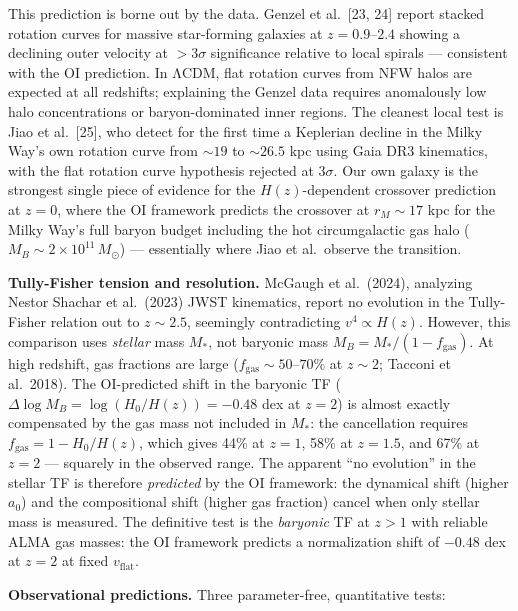 \documentclass[
]{article}
\begin{document}
This prediction is borne out by the data. Genzel et al.~{[}23, 24{]}
report stacked rotation curves for massive star-forming galaxies at
\(z = 0.9\text{–}2.4\) showing a declining outer velocity at
\(> 3\sigma\) significance relative to local spirals --- consistent with
the OI prediction. In ΛCDM, flat rotation curves from NFW halos are
expected at all redshifts; explaining the Genzel data requires
anomalously low halo concentrations or baryon-dominated inner regions.
The cleanest local test is Jiao et al.~{[}25{]}, who detect for the
first time a Keplerian decline in the Milky Way's own rotation curve
from \(\sim 19\) to \(\sim 26.5\) kpc using Gaia DR3 kinematics, with
the flat rotation curve hypothesis rejected at \(3\sigma\). Our own
galaxy is the strongest single piece of evidence for the
\(H(z)\)-dependent crossover prediction at \(z = 0\), where the OI
framework predicts the crossover at \(r_M \sim 17\) kpc for the Milky
Way's full baryon budget including the hot circumgalactic gas halo
(\(M_B \sim 2 \times 10^{11}\,M_\odot\)) --- essentially where Jiao et
al.~observe the transition.

\textbf{Tully-Fisher tension and resolution.} McGaugh et al.~(2024),
analyzing Nestor Shachar et al.~(2023) JWST kinematics, report no
evolution in the Tully-Fisher relation out to \(z \sim 2.5\), seemingly
contradicting \(v^4 \propto H(z)\). However, this comparison uses
\emph{stellar} mass \(M_*\), not baryonic mass
\(M_B = M_*/(1-f_{\text{gas}})\). At high redshift, gas fractions are
large (\(f_{\text{gas}} \sim 50\text{–}70\%\) at \(z \sim 2\); Tacconi
et al.~2018). The OI-predicted shift in the baryonic TF
(\(\Delta\log M_B = \log(H_0/H(z)) = -0.48\) dex at \(z = 2\)) is almost
exactly compensated by the gas mass not included in \(M_*\): the
cancellation requires \(f_{\text{gas}} = 1 - H_0/H(z)\), which gives
44\% at \(z = 1\), 58\% at \(z = 1.5\), and 67\% at \(z = 2\) ---
squarely in the observed range. The apparent ``no evolution'' in the
stellar TF is therefore \emph{predicted} by the OI framework: the
dynamical shift (higher \(a_0\)) and the compositional shift (higher gas
fraction) cancel when only stellar mass is measured. The definitive test
is the \emph{baryonic} TF at \(z > 1\) with reliable ALMA gas masses:
the OI framework predicts a normalization shift of \(-0.48\) dex at
\(z = 2\) at fixed \(v_{\text{flat}}\).

\textbf{Observational predictions.} Three parameter-free, quantitative
tests:
\end{document}
